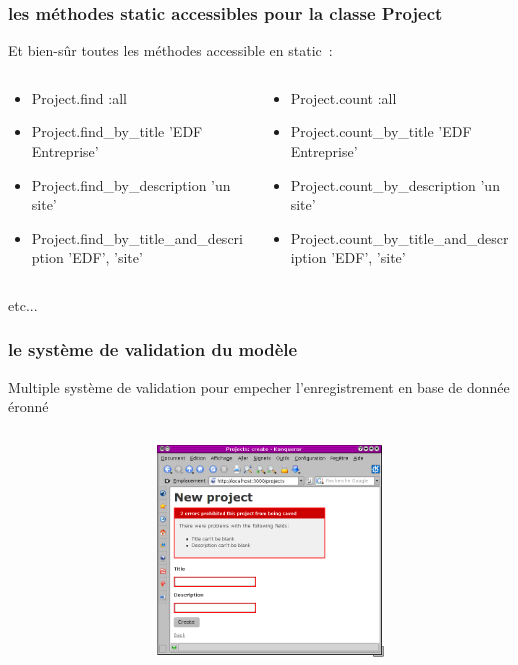 \documentclass{beamer}
\begin{document}
\begin{frame}
    \frametitle{les méthodes static accessibles pour la classe Project}
    Et bien-sûr toutes les méthodes accessible en static~:
    \tiny{}
    \begin{columns}
        \begin{column}[l]{5cm}
            \begin{itemize}
                \item Project.find :all
                \item Project.find\_by\_title 'EDF Entreprise'
                \item Project.find\_by\_description 'un site'
                \item Project.find\_by\_title\_and\_description 'EDF', 'site'
            \end{itemize}
        \end{column}

        \begin{column}[r]{6cm}
            \begin{itemize}
                \item Project.count :all
                \item Project.count\_by\_title 'EDF Entreprise'
                \item Project.count\_by\_description 'un site'
                \item Project.count\_by\_title\_and\_description 'EDF', 'site'
            \end{itemize}
        \end{column}
    \end{columns}
    \normalsize{}
    etc...
\end{frame}

\begin{frame}
    \frametitle{le système de validation du modèle}
    Multiple système de validation pour empecher l'enregistrement en base de
    donnée éronné
    \scriptsize{}
    \begin{columns}
        \begin{column}[l]{5cm}
            
        \end{column}

        \begin{column}[r]{5cm}
            \includegraphics[width=60mm]{error_screenshot.png}
        \end{column}
    \end{columns}
\end{frame}
\end{document}
